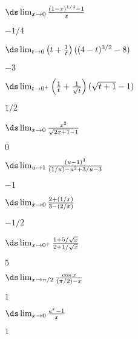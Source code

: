 \begin{multicols}{2}[]
\begin{enumialphparenastyle}
\begin{ex} 
 $\ds\lim_{x\to0}{(1-x)^{1/4}-1\over x}$
\begin{sol}
 $-1/4$
\end{sol}
\end{ex}

\begin{ex} 
 $\ds\lim_{t\to 0}{\left(t+{1\over t}\right)((4-t)^{3/2}-8)}$
\begin{sol}
 $-3$
\end{sol}
\end{ex}

\begin{ex} 
 $\ds\lim_{t\to 0^+}\left({1\over t}+{1\over\sqrt{t}}\right)
(\sqrt{t+1}-1)$
\begin{sol}
 $1/2$
\end{sol}
\end{ex}

\begin{ex} 
 $\ds\lim_{x\to 0}{x^2\over\sqrt{2x+1}-1}$
\begin{sol}
 $0$
\end{sol}
\end{ex}

\begin{ex} 
 $\ds\lim_{u\to 1}{(u-1)^3\over (1/u)-u^2+3/u-3}$
\begin{sol}
 $-1$
\end{sol}
\end{ex}

\begin{ex} 
 $\ds\lim_{x\to 0}{2+(1/x)\over 3-(2/x)}$
\begin{sol}
 $-1/2$
\end{sol}
\end{ex}

\begin{ex} 
 $\ds\lim_{x\to 0^+}{1+5/\sqrt{x}\over 2+1/\sqrt{x}}$
\begin{sol}
 $5$
\end{sol}
\end{ex}

\begin{ex} 
 $\ds\lim_{x\to\pi/2}{\cos x\over (\pi/2)-x}$
\begin{sol}
 $1$
\end{sol}
\end{ex}

\begin{ex} 
 $\ds\lim_{x\to0}{e^x-1\over x}$
\begin{sol}
 $1$
\end{sol}
\end{ex}


\end{enumialphparenastyle}
\end{multicols}
